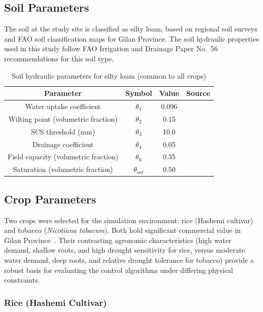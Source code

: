 \subsection{Soil Parameters}
\label{soil_param}
The soil at the study site is classified as silty loam, based on regional soil surveys and FAO soil classification maps for Gilan Province. The soil hydraulic properties used in this study follow FAO Irrigation and Drainage Paper No.~56 recommendations for this soil type. 

\begin{table}[htbp]
\centering
\caption{Soil hydraulic parameters for silty loam (common to all crops)}
\label{tab:soil}

\begin{tabular}{cccc}
\toprule
\textbf{Parameter} & \textbf{Symbol} & \textbf{Value} & \textbf{Source}\\
\midrule
Water uptake coefficient & $\theta_1$ & 0.096 & \cite{Lopezjimenez2024} \\
Wilting point (volumetric fraction) & $\theta_2$ & 0.15 & \cite{allen1998} \\
SCS threshold (mm) & $\theta_3$ & 10.0 & \cite{Lopezjimenez2024} \\
Drainage coefficient & $\theta_4$ & 0.05 & \cite{Lopezjimenez2024} \\
Field capacity (volumetric fraction) & $\theta_6$ & 0.35 & \cite{allen1998} \\
Saturation (volumetric fraction) & $\theta_{sat}$ & 0.50 & \cite{rawls1982} \\
\bottomrule
\end{tabular}
\end{table}

\subsection{Crop Parameters}
\label{crop_param}

Two crops were selected for the simulation environment: rice (Hashemi cultivar) and tobacco (\emph{Nicotiana tabacum}). Both hold significant commercial value in Gilan Province~\cite{surfiran2025, iranica_tobacco}. Their contrasting agronomic characteristics (high water demand, shallow roots, and high drought sensitivity for rice, versus moderate water demand, deep roots, and relative drought tolerance for tobacco) provide a robust basis for evaluating the control algorithms under differing physical constraints.

\subsubsection{Rice (Hashemi Cultivar)}


